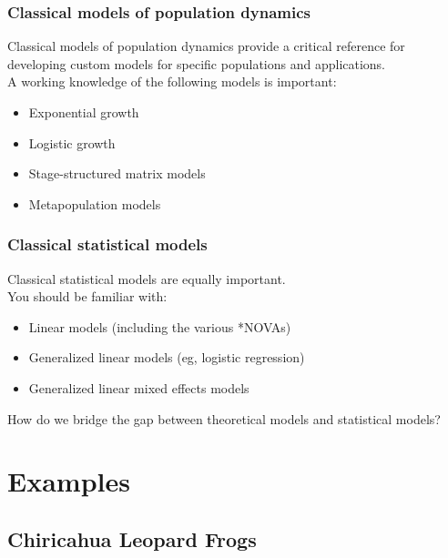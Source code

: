 \documentclass[color=usenames,dvipsnames]{beamer}\usepackage[]{graphicx}\usepackage[]{color}
\begin{document}
\begin{frame}
  \frametitle{Classical models of population dynamics}
  Classical models of population dynamics provide a critical reference
  for developing custom models for specific populations and
  applications. \\
  \pause
  \vfill
  A working knowledge of the following models is important:
  \begin{itemize}
    \item Exponential growth
    \item Logistic growth
    \item Stage-structured matrix models
    \item Metapopulation models
  \end{itemize}
\end{frame}


\begin{frame}
  \frametitle{Classical statistical models}
  Classical statistical models are equally important. \\
  \pause
  \vfill
  You should be familiar with:
  \begin{itemize}
    \item Linear models (including the various *NOVAs)
    \item Generalized linear models (eg, logistic regression)
    \item Generalized linear mixed effects models
  \end{itemize}
\end{frame}



\begin{frame}
  \LARGE 
  \centering
  How do we bridge the gap between theoretical models and statistical 
  models?  \\
\end{frame}


\section{Examples}


\subsection{Chiricahua Leopard Frogs}
\end{document}
